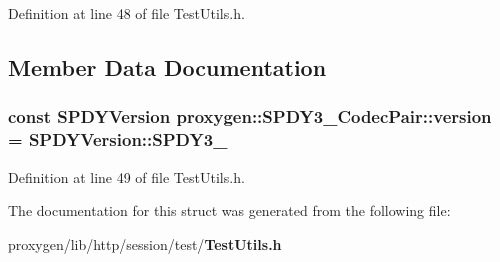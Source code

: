 Definition at line 48 of file Test\+Utils.\+h.



\subsection{Member Data Documentation}
\subsubsection[{version}]{\setlength{\rightskip}{0pt plus 5cm}const {\bf S\+P\+D\+Y\+Version} proxygen\+::\+S\+P\+D\+Y3\+\_\+Codec\+Pair\+::version = {\bf S\+P\+D\+Y\+Version\+::\+S\+P\+D\+Y3\+\_}\hspace{0.3cm}{\ttfamily [static]}}\label{structproxygen_1_1SPDY3__1CodecPair_aede8d327a5ed33a9ecf1199e9063d7cb}


Definition at line 49 of file Test\+Utils.\+h.



The documentation for this struct was generated from the following file\+:\begin{DoxyCompactItemize}
\item 
proxygen/lib/http/session/test/{\bf Test\+Utils.\+h}\end{DoxyCompactItemize}
